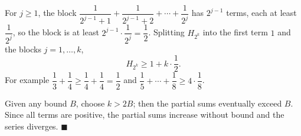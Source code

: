 For $j\ge1$, the block $\dfrac1{2^{j-1}+1}+\dfrac1{2^{j-1}+2}+\cdots+\dfrac1{2^j}$ has $2^{j-1}$ terms, each at least $\dfrac1{2^j}$, so the block is at least $2^{j-1}\cdot\dfrac1{2^j}=\dfrac12$. Splitting $H_{2^k}$ into the first term $1$ and the blocks $j=1,\dots,k$,
\[H_{2^k}\ge1+k\cdot\dfrac12.\]
For example $\dfrac13+\dfrac14\ge\dfrac14+\dfrac14=\dfrac12$ and $\dfrac15+\cdots+\dfrac18\ge4\cdot\dfrac18$.

Given any bound $B$, choose $k>2B$; then the partial sums eventually exceed $B$. Since all terms are positive, the partial sums increase without bound and the series diverges. $\blacksquare$
